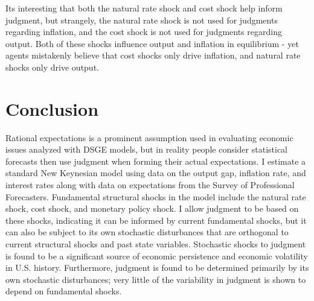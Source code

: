 \documentclass[12pt]{article}
\begin{document}
{Its interesting that both the natural rate shock and cost shock help inform judgment, but strangely, the natural rate shock is not used for judgments regarding inflation, and the cost shock is not used for judgments regarding output.  Both of these shocks influence output and inflation in equilibrium - yet agents mistakenly believe that cost shocks only drive inflation, and natural rate shocks only drive output.

\section{Conclusion}
Rational expectations is a prominent assumption used in evaluating economic issues analyzed with DSGE models, but in reality people consider statistical forecasts then use judgment when forming their actual expectations.  I estimate a standard New Keynesian model using data on the output gap, inflation rate, and interest rates along with data on expectations from the Survey of Professional Forecasters.   Fundamental structural shocks in the model include the natural rate shock, cost shock, and monetary policy shock.  I allow judgment to be based on these shocks, indicating it can be informed by current fundamental shocks, but it can also be subject to its own stochastic disturbances that are orthogonal to current structural shocks and past state variables.  Stochastic shocks to judgment is found to be a significant source of economic persistence and economic volatility in U.S. history.  Furthermore, judgment is found to be determined primarily by its own stochastic disturbances; very little of the variability in judgment is shown to depend on fundamental shocks.



\newpage
\begin{singlespace}
\nocite{*}


\end{singlespace}

\newpage

}
\end{document}

